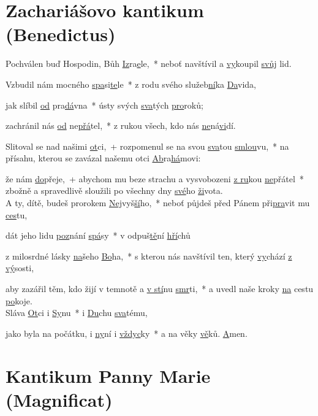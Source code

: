 \documentclass[12pt, a4paper]{article}
\begin{document}
\section*{Zachariášovo kantikum (Benedictus)}

Pochválen buď Hospodin, Bůh \underline{Iz}ra\underline{e}le,~* neboť navštívil a \underline{vy}koupil \underline{svůj} lid. 

Vzbudil nám mocného \underline{spa}si\underline{te}le~* z rodu svého služeb\underline{ní}ka \underline{Da}vida, 

jak slíbil \underline{od} pra\underline{dá}vna~* ústy svých \underline{sva}tých \underline{pro}roků; 

zachránil nás \underline{od} ne\underline{přá}tel,~* z rukou všech, kdo nás \underline{ne}ná\underline{vi}dí. 

Slitoval se nad našimi \underline{ot}ci,~+ rozpomenul se na svou \underline{sva}tou \underline{smlou}vu,~* na přísahu, kterou se zavázal našemu otci \underline{Ab}ra\underline{há}movi: 

že nám \underline{do}přeje,~+ abychom mu beze strachu a vysvobozeni \underline{z ru}kou \underline{ne}přátel~* zbožně a spravedlivě sloužili po všechny dny \underline{své}ho \underline{ži}vota.\\



A ty, dítě, budeš prorokem \underline{Nej}vyš\underline{ší}ho,~* neboť půjdeš před Pánem při\underline{pra}vit mu \underline{ces}tu, 

dát jeho lidu \underline{poz}nání \underline{spá}sy~* v odpuš\underline{tě}ní \underline{hří}chů 

z milosrdné lásky \underline{na}šeho \underline{Bo}ha,~* s kterou nás navštívil ten, který \underline{vy}chází \underline{z vý}sosti, 

aby zazářil těm, kdo žijí v temnotě a \underline{v stí}nu \underline{smr}ti,~* a uvedl naše kroky \underline{na} cestu \underline{po}koje.\\



Sláva \underline{Ot}ci i \underline{Sy}nu~* i \underline{Du}chu \underline{sva}tému, 

jako byla na počátku, i \underline{ny}ní i \underline{vždyc}ky~* a na věky \underline{vě}ků. \underline{A}men.

\pagebreak

\section*{Kantikum Panny Marie (Magnificat)}
\end{document}
